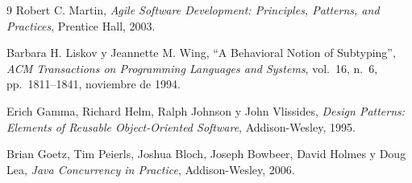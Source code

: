 \documentclass[11pt,a4paper]{article}
\begin{document}
\begin{thebibliography}{9}
  Robert C. Martin,
  \emph{Agile Software Development: Principles, Patterns, and Practices},
  Prentice Hall, 2003.

  Barbara H. Liskov y Jeannette M. Wing,
  ``A Behavioral Notion of Subtyping'',
  \emph{ACM Transactions on Programming Languages and Systems},
  vol.~16, n.~6, pp.~1811--1841, noviembre de 1994.

  Erich Gamma, Richard Helm, Ralph Johnson y John Vlissides,
  \emph{Design Patterns: Elements of Reusable Object-Oriented Software},
  Addison-Wesley, 1995.

  Brian Goetz, Tim Peierls, Joshua Bloch, Joseph Bowbeer, David Holmes y
  Doug Lea,
  \emph{Java Concurrency in Practice},
  Addison-Wesley, 2006.
\end{thebibliography}
\end{document}
